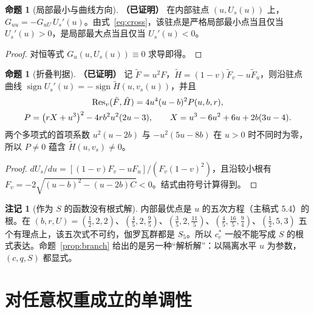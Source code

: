 \documentclass[11pt,a4paper]{ctexart}
\theoremstyle{definition}
\newtheorem{proposition}[theorem]{命题}
\theoremstyle{definition}
\newtheorem{remark}[theorem]{注记}
\newcommand{\proven}{\textbf{（已证明）}}
\begin{document}
\begin{proposition}[局部最小与曲线方向]\label{prop:minmax}\proven
在内部驻点 $(u,U_s(u))$ 上，$G_{uu}=-G_{uU}\,U_s'(u)$。由式~\eqref{eq:cross}，该驻点是严格局部最小点当且仅当 $U_s'(u)>0$，是局部最大点当且仅当 $U_s'(u)<0$。
\end{proposition}
\begin{proof}
对恒等式 $G_u(u,U_s(u))\equiv0$ 求导即得。
\end{proof}

\begin{proposition}[折叠判据]\label{prop:fold}\proven
记 $\tilde F=u^2F$，$\tilde H=(1-v)\tilde F_v-u\tilde F_u$，则沿驻点曲线 $\operatorname{sign}U_s'(u)=-\operatorname{sign}\tilde H(u,v_s(u))$，并且
\begin{gather}
\operatorname{Res}_v(\tilde F,\tilde H)=4u^4(u-b)^2P(u,b,r),\notag\\
P=\bigl(rX+u^3\bigr)^2-4rb^2u^2(2u-3),\qquad X=u^3-6u^2+6u+2b(3u-4).
\label{eq:P}
\end{gather}
两个多项式的首项系数 $u^2(u-2b)$ 与 $-u^2(5u-8b)$ 在 $u>0$ 时不同时为零，所以 $P\neq0$ 蕴含 $\tilde H(u,v_s)\neq0$。
\end{proposition}
\begin{proof}
$dU_s/du=[(1-v)F_v-uF_u]/(F_v(1-v)^2)$，且沿较小根有 $F_v=-2\sqrt{(u-b)^2-(u-2b)C}<0$。结式由符号计算得到。
\end{proof}

\begin{remark}[作为 $S$ 的函数没有根式解]\label{rem:galois}
内部最优点是 $u$ 的五次方程（主稿式 5.4）的根。在 $(b,r,U)=(\tfrac12,2,2)$、$(\tfrac45,2,\tfrac95)$、$(\tfrac35,2,\tfrac{11}5)$、$(\tfrac45,\tfrac{16}5,\tfrac94)$、$(\tfrac12,5,3)$ 五个有理点上，该五次式不可约，伽罗瓦群都是 $S_5$。所以 $c_c^*$ 一般不能写成 $S$ 的根式表达。命题~\ref{prop:branch} 给出的是另一种“解析解”：以隔离水平 $u$ 为参数，$(c,q,S)$ 都显式。
\end{remark}

\section{对任意权重成立的单调性}
\label{sec:monotone}
\end{document}
